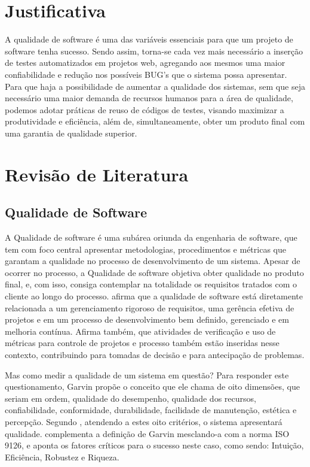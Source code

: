 \documentclass[12pt]{article}
\begin{document}
	\section{Justificativa}
	
	A qualidade de software  é uma das variáveis essenciais para que um projeto de software tenha sucesso.
	Sendo assim, torna-se cada vez mais necessário a inserção de testes automatizados em projetos web,
	agregando aos mesmos uma maior confiabilidade e redução nos possíveis BUG's que o sistema possa
	apresentar. Para que haja a possibilidade de aumentar a qualidade dos sistemas, sem que seja necessário uma maior
	demanda de recursos humanos para a área de qualidade, podemos adotar práticas de reuso de códigos de testes, visando
	maximizar a produtividade e eficiência, além de, simultaneamente, obter um produto final com uma garantia de qualidade
	superior.
	
	\section{Revisão de Literatura}
	
	\subsection{Qualidade de Software}
	
	A Qualidade de software é uma subárea oriunda da engenharia de software, que tem com foco central apresentar metodologias,
	procedimentos e métricas que garantam a qualidade no processo de desenvolvimento de um sistema. Apesar de ocorrer no processo, a Qualidade de software
	objetiva obter qualidade no produto final, e, com isso, consiga contemplar na totalidade os requisitos tratados com o cliente ao longo do processo.
    \citeauthor{de2006introduccao} \cite{de2006introduccao} afirma que a qualidade de software está diretamente relacionada a um gerenciamento
    rigoroso de requisitos, uma gerência efetiva de projetos e em um processo de desenvolvimento bem definido, gerenciado e em melhoria contínua. Afirma também,
    que atividades de verificação e uso de métricas para controle de projetos e processo também estão inseridas nesse contexto, contribuindo para tomadas de
    decisão e para antecipação de problemas.

    Mas como medir a qualidade de um sistema em questão? Para responder este questionamento, Garvin \cite{garvin1987competing} propõe o conceito que ele chama de
    oito dimensões, que seriam em ordem, qualidade do desempenho, qualidade dos recursos, confiabilidade, conformidade, durabilidade, facilidade de manutenção,
    estética e percepção. Segundo \citeauthor{garvin1987competing}, atendendo a estes oito critérios, o sistema apresentará qualidade.
    \citeauthor{pressman2011engenharia} \cite{pressman2011engenharia} complementa a definição de Garvin mesclando-a com a norma ISO 9126, e aponta os fatores
    críticos para o sucesso neste caso, como sendo: Intuição, Eficiência, Robustez e Riqueza.
\end{document}

